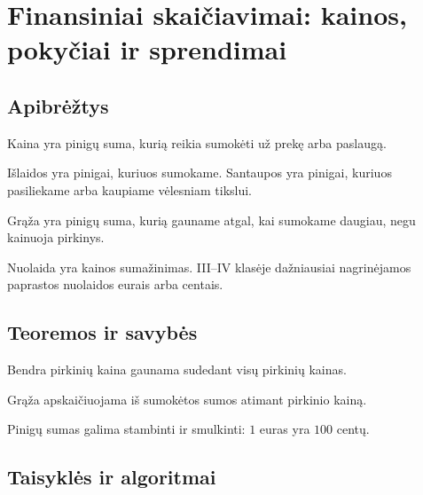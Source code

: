 \section{Finansiniai skaičiavimai: kainos, pokyčiai ir sprendimai}\label{sec:finansiniai-skaiciavimai-kainos-pokyciai-sprendimai}

\subsection{Apibrėžtys}

\begin{apibreztis}
Kaina yra pinigų suma, kurią reikia sumokėti už prekę arba paslaugą.
\end{apibreztis}

\begin{apibreztis}
Išlaidos yra pinigai, kuriuos sumokame. Santaupos yra pinigai, kuriuos pasiliekame arba kaupiame vėlesniam tikslui.
\end{apibreztis}

\begin{apibreztis}
Grąža yra pinigų suma, kurią gauname atgal, kai sumokame daugiau, negu kainuoja pirkinys.
\end{apibreztis}

\begin{apibreztis}
Nuolaida yra kainos sumažinimas. III--IV klasėje dažniausiai nagrinėjamos paprastos nuolaidos eurais arba centais.
\end{apibreztis}

\subsection{Teoremos ir savybės}

\begin{savybe}
Bendra pirkinių kaina gaunama sudedant visų pirkinių kainas.
\end{savybe}

\begin{savybe}
Grąža apskaičiuojama iš sumokėtos sumos atimant pirkinio kainą.
\end{savybe}

\begin{savybe}
Pinigų sumas galima stambinti ir smulkinti: \(1\) euras yra \(100\) centų.
\end{savybe}

\subsection{Taisyklės ir algoritmai}

